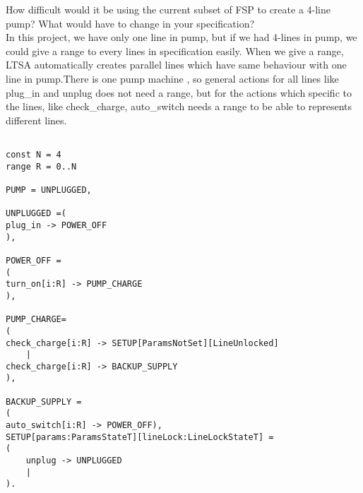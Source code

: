 ﻿\documentclass{article}
\begin{document}
How difficult would it be using the current subset of FSP to create
a 4-line pump? What would have to change in your specification? \\

In this project, we have only one line in pump, but if we had 4-lines in pump, we could give a range to every lines in specification easily.
When we give a range, LTSA automatically creates parallel lines which have same behaviour with one line in pump.There is one pump machine , so general actions for all lines like plug\_in and unplug does not need a range, but for the actions which specific to the lines, like check\_charge, auto\_switch needs a range to be able to represents different lines.

\begin{verbatim}

const N = 4 
range R = 0..N 

PUMP = UNPLUGGED,

UNPLUGGED =(
plug_in -> POWER_OFF
),

POWER_OFF =
(
turn_on[i:R] -> PUMP_CHARGE
),

PUMP_CHARGE=
(
check_charge[i:R] -> SETUP[ParamsNotSet][LineUnlocked]
	|
check_charge[i:R] -> BACKUP_SUPPLY
),

BACKUP_SUPPLY =
(
auto_switch[i:R] -> POWER_OFF),
SETUP[params:ParamsStateT][lineLock:LineLockStateT] = 
(
	unplug -> UNPLUGGED
	|
).
\end{verbatim}
\end{document}

